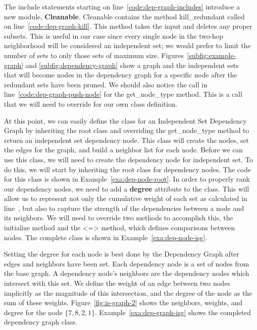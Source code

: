 

The {\ttfamily include} statements starting on line~\ref{code:dep-graph-includes} introduce a new module, {\bfseries Cleanable}. Cleanable contains the method {\ttfamily kill\_redundant} called on line~\ref{code:dep-graph-kill}. This method takes the input and deletes any proper subsets. This is useful in our case since every single node in the two-hop neighborhood will be considered an independent set; we would prefer to limit the number of sets to only those sets of maximum size. Figures~\ref{subfig:example-graph} and \ref{subfig:dependency-graph} show a graph and the independent sets that will become nodes in the dependency graph for a specific node after the redundant sets have been pruned. We should also notice the call in line~\ref{code:dep-graph-push-node} for the {\ttfamily get\_node\_type} method. This is a call that we will need to override for our own class definition. 



At this point, we can easily define the class for an Independent Set Dependency Graph by inheriting the root class and overriding the {\ttfamily get\_node\_type} method to return an independent set dependency node. This class will create the nodes, set the edges for the graph, and build a neighbor list for each node. Before we can use this class, we will need to create the dependency node for independent set. To do this, we will start by inheriting the root class for dependency nodes. The code for this class is shown in Example~\ref{exa:dep-node-root}. In order to properly rank our dependency nodes, we need to add a {\bfseries degree} attribute to the class. This will allow us to represent not only the cumulative weight of each set as calculated in line~, but also to capture the strength of the dependencies between a node and its neighbors. We will need to override two methods to accomplish this, the {\ttfamily initialize} method and the {\ttfamily <=>} method, which defines comparisons between nodes. The complete class is shown in Example~\ref{exa:dep-node-isg}.




Setting the degree for each node is best done by the Dependency Graph after edges and neighbors have been set. Each dependency node is a set of nodes from the base graph. A dependency node's neighbors are the dependency nodes which intersect with this set. We define the weight of an edge between two nodes implicitly as the magnitude of this intersection, and the degree of the node as the sum of these weights. Figure~\ref{fig:is-graph-2} shows the neighbors, weights, and degree for the node $\{7,8,2,1\}$. Example~\ref{exa:dep-graph-isg} shows the completed dependency graph class.
 

